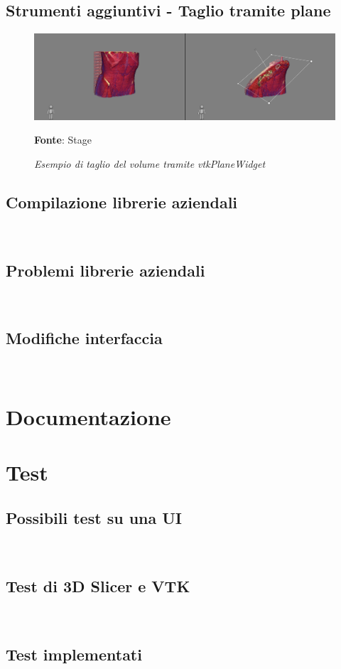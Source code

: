 \subsection{Strumenti aggiuntivi - Taglio tramite plane}
\begin{figure}[h]
    \centering
    \includegraphics[width=1\textwidth]{immagini/svolgimento/planecrop.png}
    \caption{\textit{Esempio di taglio del volume tramite vtkPlaneWidget}}
    \textbf{Fonte}: Stage
    \label{fig: Taglio Plane}
\end{figure}

\subsection{Compilazione librerie aziendali}
\\

\subsection{Problemi librerie aziendali}
\\

\subsection{Modifiche interfaccia}
\\

\section{Documentazione}

\section{Test}
\subsection{Possibili test su una UI}
\\

\subsection{Test di 3D Slicer e VTK}
\\

\subsection{Test implementati}
\\